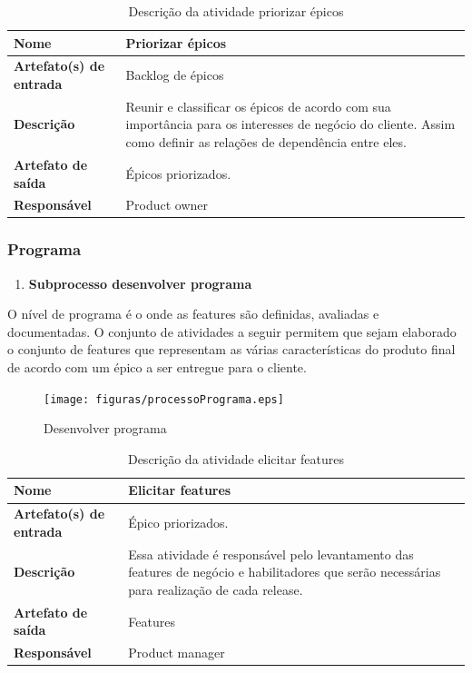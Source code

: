     \begin{table}[H]
        \centering
        \label{descricaoAtividades7}
        \caption{Descrição da atividade priorizar épicos}
            \begin{tabular}{|l|p{10cm}|}
            \hline
            \textbf{Nome} & Priorizar épicos \\
            \hline
            \textbf{Artefato(s) de entrada} & Backlog de épicos \\
            \hline
            \textbf{Descrição} & Reunir e classificar os épicos de acordo com sua importância para os interesses de negócio do cliente. Assim como definir as relações de dependência entre eles. \\
            \hline
            \textbf{Artefato de saída} & Épicos priorizados. \\
            \hline
            \textbf{Responsável} & Product owner \\
            \hline
        \end{tabular}
    \end{table}

    \subsubsection{Programa}
    \begin{enumerate}
    \item \textbf{Subprocesso desenvolver programa}
    \end{enumerate}
    O nível de programa é o onde as features são definidas, avaliadas e documentadas. O conjunto de atividades a seguir permitem que sejam elaborado o conjunto de features que representam as várias características do produto final de acordo com um épico a ser entregue para o cliente.

    \begin{figure}[H]
        \centering
        \caption{Desenvolver programa}
        \label{processoPrograma}
        \texttt{[image: figuras/processoPrograma.eps]}
    \end{figure}

    \begin{table}[H]
        \centering
        \label{descricaoAtividades8}
        \caption{Descrição da atividade elicitar features}
            \begin{tabular}{|l|p{10cm}|}
            \hline
            \textbf{Nome} & Elicitar features \\
            \hline
            \textbf{Artefato(s) de entrada} & Épico priorizados. \\
            \hline
            \textbf{Descrição} & Essa atividade é responsável pelo levantamento das features de negócio e habilitadores que serão necessárias para realização de cada release. \\
            \hline
            \textbf{Artefato de saída} & Features \\
            \hline
            \textbf{Responsável} & Product manager \\
            \hline
        \end{tabular}
    \end{table}

